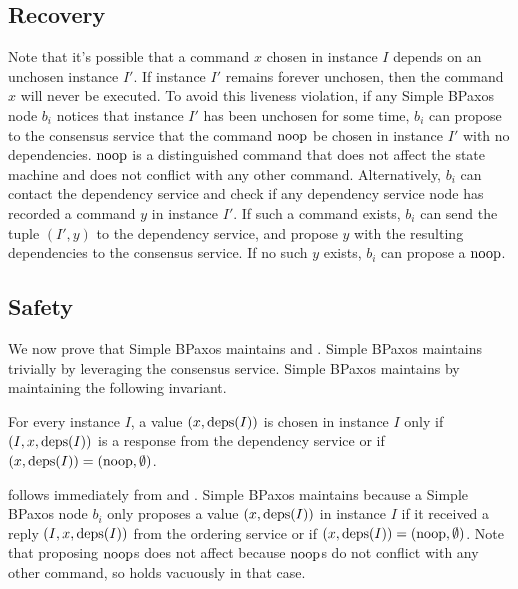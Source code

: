 \subsection{Recovery}
Note that it's possible that a command $x$ chosen in instance $I$ depends on an
unchosen instance $I'$. If instance $I'$ remains forever unchosen, then the
command $x$ will never be executed. To avoid this liveness violation, if any
Simple BPaxos node $b_i$ notices that instance $I'$ has been unchosen for some
time, $b_i$ can propose to the consensus service that the command $\text{noop}$ be
chosen in instance $I'$ with no dependencies. $\text{noop}$ is a distinguished
command that does not affect the state machine and does not conflict with any
other command.
%
Alternatively, $b_i$ can contact the dependency service and check if any
dependency service node has recorded a command $y$ in instance $I'$. If such a
command exists, $b_i$ can send the tuple $(I', y)$ to the dependency service,
and propose $y$ with the resulting dependencies to the consensus service. If no
such $y$ exists, $b_i$ can propose a $\text{noop}$.

\subsection{Safety}
We now prove that Simple BPaxos maintains  and
.
%
Simple BPaxos maintains  trivially by leveraging the
consensus service. Simple BPaxos maintains  by
maintaining the following invariant.

\begin{invariant}
  For every instance $I$, a value $(x, \text{deps}(I))$ is chosen in instance $I$
  only if $(I, x, \text{deps}(I))$ is a response from the dependency service or if
  $(x, \text{deps}(I)) = (\text{noop}, \emptyset)$.
\end{invariant}

 follows immediately from 
and .  Simple BPaxos maintains
 because a Simple BPaxos node $b_i$ only proposes
a value $(x, \text{deps}(I))$ in instance $I$ if it received a reply $(I, x,
\text{deps}(I))$ from the ordering service or if $(x, \text{deps}(I)) = (\text{noop},
\emptyset)$. Note that proposing $\text{noop}{}$s does not affect
 because $\text{noop}$s do not conflict with any other
command, so  holds vacuously in that case.

